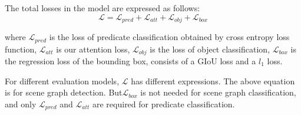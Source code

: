 The total losses in the model are expressed as follows:
$$\mathcal{L} = \mathcal{L}_{pred}+\mathcal{L}_{att} +\mathcal{L}_{obj} + \mathcal{L}_{box} $$

where  $ \mathcal{L}_{pred} $ is the loss of predicate classification obtained by cross entropy loss function, $ \mathcal{L}_{att} $ is our attention loss, $ \mathcal{L}_{obj } $ is the loss of object classification, $ \mathcal{L}_{box} $ is the regression loss of the bounding box,  consists of a GIoU loss and a $l_1$ loss.

For different evaluation models, $ \mathcal{L}  $ has different expressions. The above equation is for scene graph detection.  But$ \mathcal{L}_{box} $ is not needed for scene graph classification, and only $  \mathcal{L}_{pred}$ and $\mathcal{L}_{att} $ are required for predicate classification. 

